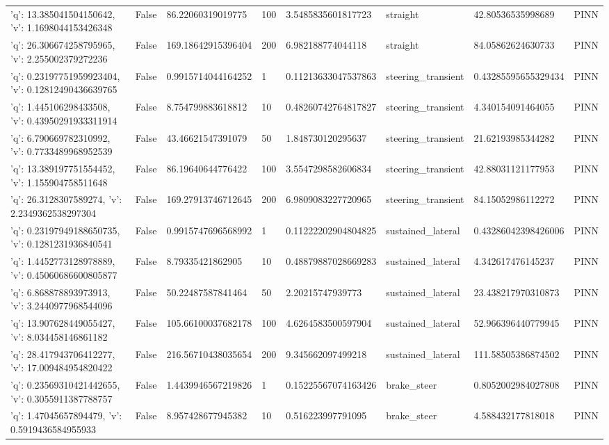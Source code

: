 \begin{tabular}{llllllll}
{'q': 13.385041504150642, 'v': 1.1698044153426348} & False & 86.22060319019775 & 100 & 3.5485835601817723 & straight & 42.80536535998689 & PINN \\
{'q': 26.306674258795965, 'v': 2.255002379272236} & False & 169.18642915396404 & 200 & 6.982188774044118 & straight & 84.05862624630733 & PINN \\
{'q': 0.23197751959923404, 'v': 0.12812490436639765} & False & 0.9915714044164252 & 1 & 0.11213633047537863 & steering\_transient & 0.43285595655329434 & PINN \\
{'q': 1.445106298433508, 'v': 0.43950291933311914} & False & 8.754799883618812 & 10 & 0.48260742764817827 & steering\_transient & 4.340154091464055 & PINN \\
{'q': 6.790669782310992, 'v': 0.7733489968952539} & False & 43.46621547391079 & 50 & 1.848730120295637 & steering\_transient & 21.62193985344282 & PINN \\
{'q': 13.389197751554452, 'v': 1.155904758511648} & False & 86.19640644776422 & 100 & 3.5547298582606834 & steering\_transient & 42.88031121177953 & PINN \\
{'q': 26.3128307589274, 'v': 2.2349362538297304} & False & 169.27913746712645 & 200 & 6.9809083227720965 & steering\_transient & 84.15052986112272 & PINN \\
{'q': 0.23197949188650735, 'v': 0.1281231936840541} & False & 0.9915747696568992 & 1 & 0.11222202904804825 & sustained\_lateral & 0.43286042398426006 & PINN \\
{'q': 1.4452773128978889, 'v': 0.45060686600805877} & False & 8.79335421862905 & 10 & 0.48879887028669283 & sustained\_lateral & 4.342617476145237 & PINN \\
{'q': 6.868878893973913, 'v': 3.2440977968544096} & False & 50.22487587841464 & 50 & 2.20215747939773 & sustained\_lateral & 23.438217970310873 & PINN \\
{'q': 13.907628449055427, 'v': 8.034458146861182} & False & 105.66100037682178 & 100 & 4.6264583500597904 & sustained\_lateral & 52.966396440779945 & PINN \\
{'q': 28.417943706412277, 'v': 17.009484954820422} & False & 216.56710438035654 & 200 & 9.345662097499218 & sustained\_lateral & 111.58505386874502 & PINN \\
{'q': 0.23569310421442655, 'v': 0.3055911387788757} & False & 1.4439946567219826 & 1 & 0.15225567074163426 & brake\_steer & 0.8052002984027808 & PINN \\
{'q': 1.47045657894479, 'v': 0.5919436584955933} & False & 8.957428677945382 & 10 & 0.516223997791095 & brake\_steer & 4.588432177818018 & PINN \\

\end{tabular}
